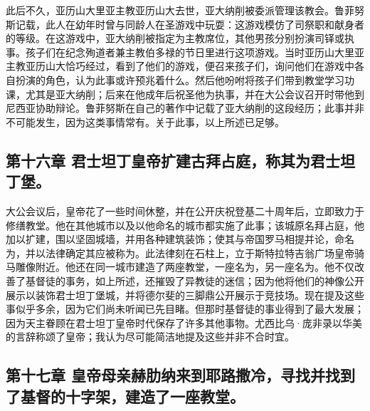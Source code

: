 此后不久，亚历山大里亚主教亚历山大去世，亚大纳削被委派管理该教会。鲁菲努斯记载，此人在幼年时曾与同龄人在圣游戏中玩耍：这游戏模仿了司祭职和献身者的等级。在这游戏中，亚大纳削被指定为主教席位，其他男孩分别扮演司铎或执事。孩子们在纪念殉道者兼主教伯多禄的节日里进行这项游戏。当时亚历山大里亚主教亚历山大恰巧经过，看到了他们的游戏，便召来孩子们，询问他们在游戏中各自扮演的角色，认为此事或许预兆着什么。然后他吩咐将孩子们带到教堂学习功课，尤其是亚大纳削；后来在他成年后祝圣他为执事，并在大公会议召开时带他到尼西亚协助辩论。鲁菲努斯在自己的著作中记载了亚大纳削的这段经历；此事并非不可能发生，因为这类事情常有。关于此事，以上所述已足够。\par


\subsection{第十六章  君士坦丁皇帝扩建古拜占庭，称其为君士坦丁堡。}

大公会议后，皇帝花了一些时间休整，并在公开庆祝登基二十周年后，立即致力于修缮教堂。他在其他城市以及以他命名的城市都实施了此事；该城原名拜占庭，他加以扩建，围以坚固城墙，并用各种建筑装饰；使其与帝国罗马相提并论，命名为，并以法律确定其应被称为。此法律刻在石柱上，立于斯特拉特吉翁广场皇帝骑马雕像附近。他还在同一城市建造了两座教堂，一座名为，另一座名为。他不仅改善了基督徒的事务，如上所述，还摧毁了异教徒的迷信；因为他将他们的神像公开展示以装饰君士坦丁堡城，并将德尔斐的三脚鼎公开展示于竞技场。现在提及这些事似乎多余，因为它们尚未听闻已先目睹。但那时基督徒的事业得到了最大发展；因为天主眷顾在君士坦丁皇帝时代保存了许多其他事物。尤西比乌·庞非录以华美的言辞称颂了皇帝；我认为尽可能简洁地提及这些并非不合时宜。\par


\subsection{第十七章  皇帝母亲赫肋纳来到耶路撒冷，寻找并找到了基督的十字架，建造了一座教堂。}

